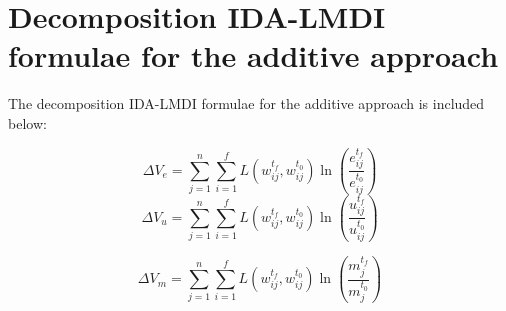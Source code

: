 \documentclass[energies,article,accept,moreauthors,12pt,a4paper]{mdpi} %
\begin{document}
\begin{thebibliography}{1}
%
%
%
%
%
%
%
%
%



\end{thebibliography}


\appendix

\section{Decomposition IDA-LMDI formulae for the additive approach}\label{app1}


The decomposition IDA-LMDI formulae for the additive approach is included below:

\begin{equation}\label{dvtot1}
  \Delta V_{e}   = \sum^n_{j=1} \sum^f_{i=1}   L(w_{ij}^{t_f},w_{ij}^{t_0}) \ln(\frac{e^{t_f}_{ij}}{e^{t_0}_{ij}})
\end{equation}
\begin{equation}\label{dvtot2}
  \Delta V_{u}   = \sum^n_{j=1} \sum^f_{i=1}   L(w_{ij}^{t_f},w_{ij}^{t_0}) \ln(\frac{u^{t_f}_{ij}}{u^{t_0}_{ij}})
\end{equation}

\begin{equation}\label{dvtot3}
  \Delta V_{m}   = \sum^n_{j=1} \sum^f_{i=1}   L(w_{ij}^{t_f},w_{ij}^{t_0}) \ln(\frac{m^{t_f}_{j}}{m^{t_0}_{j}})
\end{equation}
\end{document}

